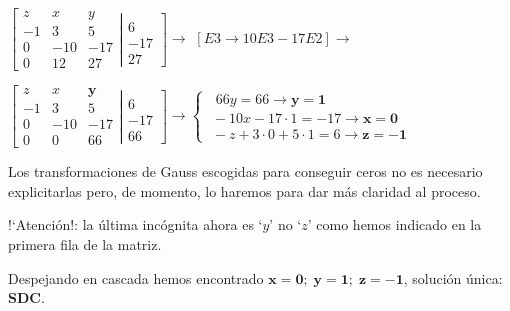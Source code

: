 \begin{proofw}
 $\left[ \begin{matrix}
  z & x & y \\
 -1 & 3 & 5 \\ 0 & -10 & -17 \\ 0 & 12 & 27 
 \end{matrix}\right. 
 \left| \begin{matrix}
  \\ 6 \\ -17 \\ 27 
 \end{matrix}\right] \to$
 \textcolor{gris}{$[E3 \to 10E3-17E2] \to $}
 
  $\left[ \begin{matrix}
  z & x & \boldsymbol{y} \\
 -1 & 3 & 5 \\ 0 & -10 & -17 \\ 0 & 0 & 66 
 \end{matrix}\right. 
 \left| \begin{matrix}
  \\ 6 \\ -17 \\ 66 
 \end{matrix}\right] \to \begin{cases}
 \; \; 66y=66 \to \boldsymbol{y=1} \\
 \; -10x-17\cdot 1=-17 \to \boldsymbol{x=0}\\
 \; -z+3\cdot 0 + 5 \cdot 1 = 6 \to \boldsymbol{z=-1}	
 \end{cases}
$

Los transformaciones de Gauss escogidas para conseguir ceros no es necesario explicitarlas pero, de momento, lo haremos para dar más claridad al proceso.

!`Atención!: la última incógnita ahora es `$y$' no `$z$' como hemos indicado en la primera fila de la matriz. 

Despejando en cascada hemos encontrado	$\boldsymbol{x=0; \; y=1; \; z=-1}$, solución única: \textbf{SDC}.	
\end{proofw}


